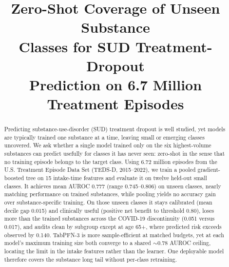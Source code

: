 \documentclass[conference]{IEEEtran}
\begin{document}
\title{Zero-Shot Coverage of Unseen Substance\\
Classes for SUD Treatment-Dropout\\
Prediction on 6.7 Million Treatment Episodes}

\author{
}

\maketitle

\begin{abstract}
Predicting substance-use-disorder (SUD) treatment dropout is well studied, yet models are
typically trained one substance at a time, leaving small or emerging classes uncovered. We ask
whether a single model trained only on the six highest-volume substances can predict usefully for
classes it has never seen: zero-shot in the sense that no training episode belongs to the
target class. Using 6.72 million episodes from the U.S. Treatment Episode Data Set (TEDS-D,
2015--2022), we train a pooled gradient-boosted tree on 15 intake-time features and evaluate it
on twelve held-out small classes. It achieves mean AUROC 0.777 (range 0.745--0.806) on unseen
classes, nearly matching performance on trained substances, while pooling yields no accuracy gain
over substance-specific training. On those unseen classes it stays calibrated (mean decile gap
0.015) and clinically useful (positive net benefit to threshold 0.80), loses more than the trained
substances across the COVID-19 discontinuity (0.051 versus 0.017), and audits clean by subgroup
except at age 65+, where predicted risk exceeds observed by 0.140. TabPFN-3 is more
sample-efficient at matched budgets, yet at each model's maximum training size both converge to a
shared $\sim$0.78 AUROC ceiling, locating the limit in the intake features rather than the
learner. One deployable model therefore covers the substance long tail without per-class
retraining.
\end{abstract}
\end{document}
